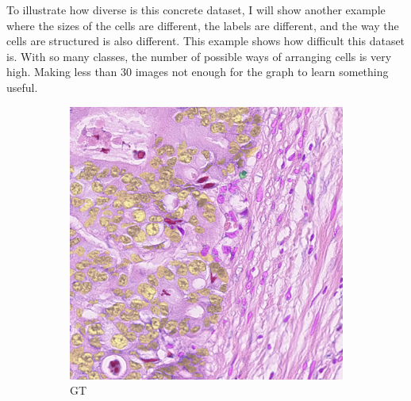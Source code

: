 To illustrate how diverse is this concrete dataset, I will show another example where the sizes of the cells are different, the labels are different, and the way the cells are structured is also different. This example shows how difficult this dataset is. With so many classes, the number of possible ways of arranging cells is very high. Making less than 30 images not enough for the graph to learn something useful. 

\begin{figure}[H]
  \centering
  \begin{subfigure}[b]{0.45\textwidth}
    \includegraphics[width=\textwidth]{imgs/qual/consep/gt2.overlay.png}
    \caption{GT}
    \label{fig:consep-gt2}
  \end{subfigure}
  \hfill
  \begin{subfigure}[b]{0.45\textwidth}

\end{subfigure}
\end{figure}
